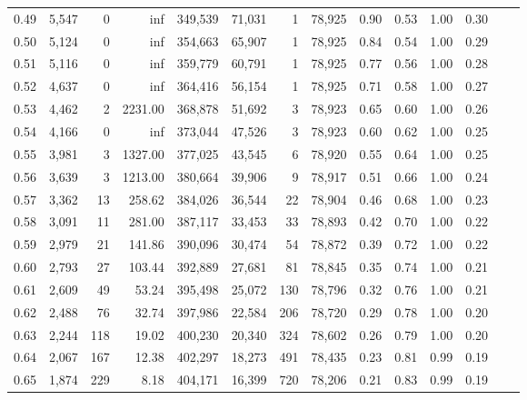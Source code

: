 \begin{tabular}{rrrrrrrrrrrrrr}
0.49 &  5,547 &      0 &      inf &  349,539 &   71,031 &       1 &  78,925 &  0.90 &  0.53 &  1.00 &      0.30 \\
0.50 &  5,124 &      0 &      inf &  354,663 &   65,907 &       1 &  78,925 &  0.84 &  0.54 &  1.00 &      0.29 \\
0.51 &  5,116 &      0 &      inf &  359,779 &   60,791 &       1 &  78,925 &  0.77 &  0.56 &  1.00 &      0.28 \\
0.52 &  4,637 &      0 &      inf &  364,416 &   56,154 &       1 &  78,925 &  0.71 &  0.58 &  1.00 &      0.27 \\
0.53 &  4,462 &      2 &  2231.00 &  368,878 &   51,692 &       3 &  78,923 &  0.65 &  0.60 &  1.00 &      0.26 \\
0.54 &  4,166 &      0 &      inf &  373,044 &   47,526 &       3 &  78,923 &  0.60 &  0.62 &  1.00 &      0.25 \\
0.55 &  3,981 &      3 &  1327.00 &  377,025 &   43,545 &       6 &  78,920 &  0.55 &  0.64 &  1.00 &      0.25 \\
0.56 &  3,639 &      3 &  1213.00 &  380,664 &   39,906 &       9 &  78,917 &  0.51 &  0.66 &  1.00 &      0.24 \\
0.57 &  3,362 &     13 &   258.62 &  384,026 &   36,544 &      22 &  78,904 &  0.46 &  0.68 &  1.00 &      0.23 \\
0.58 &  3,091 &     11 &   281.00 &  387,117 &   33,453 &      33 &  78,893 &  0.42 &  0.70 &  1.00 &      0.22 \\
0.59 &  2,979 &     21 &   141.86 &  390,096 &   30,474 &      54 &  78,872 &  0.39 &  0.72 &  1.00 &      0.22 \\
0.60 &  2,793 &     27 &   103.44 &  392,889 &   27,681 &      81 &  78,845 &  0.35 &  0.74 &  1.00 &      0.21 \\
0.61 &  2,609 &     49 &    53.24 &  395,498 &   25,072 &     130 &  78,796 &  0.32 &  0.76 &  1.00 &      0.21 \\
0.62 &  2,488 &     76 &    32.74 &  397,986 &   22,584 &     206 &  78,720 &  0.29 &  0.78 &  1.00 &      0.20 \\
0.63 &  2,244 &    118 &    19.02 &  400,230 &   20,340 &     324 &  78,602 &  0.26 &  0.79 &  1.00 &      0.20 \\
0.64 &  2,067 &    167 &    12.38 &  402,297 &   18,273 &     491 &  78,435 &  0.23 &  0.81 &  0.99 &      0.19 \\
0.65 &  1,874 &    229 &     8.18 &  404,171 &   16,399 &     720 &  78,206 &  0.21 &  0.83 &  0.99 &      0.19 \\

\end{tabular}

